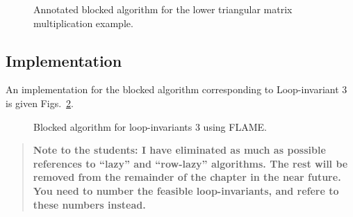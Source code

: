 \renewcommand{\moveboundaries}{%
$ 
\FlaOneByTwo{ B_L }{ B_R } 
\leftarrow
\FlaOneByThreeL{ B_0 }{ B_1 }{ B_2 }
$
and
$ 
\FlaOneByTwo{ \hat{B}_L }{ \hat{B}_R } 
\leftarrow
\FlaOneByThreeL{ \hat{B}_0 }{ \hat{B}_1 }{ \hat{B}_2 }
$
}

\renewcommand{\beforeupdate}{
\FlaOneByTwo{ B_0 }{ \FlaOneByTwoSingleLine{ B_1 }{ B_2 } }
=
\FlaOneByTwo{ L \hat{B}_0 }{ \FlaOneByTwoSingleLine{ \hat{B}_1 }{ \hat{B}_2 } }
\wedge \ldots
}

\renewcommand{\afterupdate}{
\FlaOneByTwo{ \FlaOneByTwoSingleLine{ B_0 }{ B_1 } }
{ B_2 }
=
\FlaOneByTwo{ L \FlaOneByTwoSingleLine{ \hat{B}_0 }{ \hat{B}_1 } }{ \hat{B}_2 }
\wedge \ldots
}

\renewcommand{\update}{
\begin{minipage}[t]{4in}
\noindent
$ B_1 \becomes L B_1 $\\
\end{minipage}
}

\begin{figure}[htbp]
\worksheet
\caption{Annotated blocked algorithm for the lower triangular
matrix multiplication example.}
\label{fig:ws:ltrmm_lln3_blk}
\end{figure}

\subsection{Implementation}

An implementation for the blocked algorithm corresponding to
Loop-invariant 3 is given Figs.~\ref{fig:syrk_un_right}.

\begin{figure}[htbp]
\begin{quote}
%
\end{quote}
\caption{Blocked algorithm for loop-invariants 3 using FLAME.}
\label{fig:syrk_un_right}
\end{figure}

\begin{quote}
\bf Note to the students: I have eliminated as much
as possible references to ``lazy'' and ``row-lazy'' algorithms.  The
rest will be removed from the remainder of the chapter in the near
future.  You need to number the feasible loop-invariants, and refere
to these numbers instead.
\end{quote}

